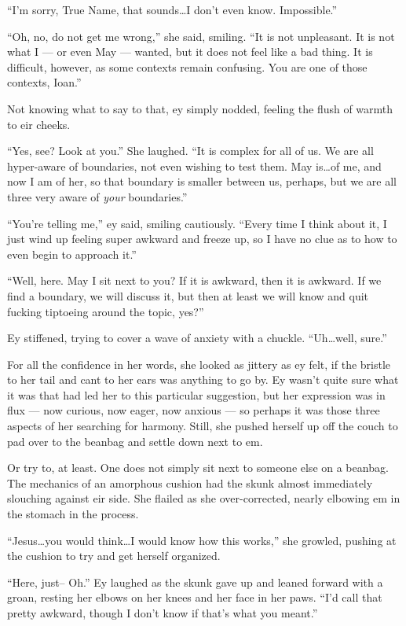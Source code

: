 ``I'm sorry, True Name, that sounds\ldots I don't even know. Impossible.''

``Oh, no, do not get me wrong,'' she said, smiling. ``It is not unpleasant. It is not what I — or even May — wanted, but it does not feel like a bad thing. It is difficult, however, as some contexts remain confusing. You are one of those contexts, Ioan.''

Not knowing what to say to that, ey simply nodded, feeling the flush of warmth to eir cheeks.

``Yes, see? Look at you.'' She laughed. ``It is complex for all of us. We are all hyper-aware of boundaries, not even wishing to test them. May is\ldots of me, and now I am of her, so that boundary is smaller between us, perhaps, but we are all three very aware of \emph{your} boundaries.''

``You're telling me,'' ey said, smiling cautiously. ``Every time I think about it, I just wind up feeling super awkward and freeze up, so I have no clue as to how to even begin to approach it.''

``Well, here. May I sit next to you? If it is awkward, then it is awkward. If we find a boundary, we will discuss it, but then at least we will know and quit fucking tiptoeing around the topic, yes?''

Ey stiffened, trying to cover a wave of anxiety with a chuckle. ``Uh\ldots well, sure.''

For all the confidence in her words, she looked as jittery as ey felt, if the bristle to her tail and cant to her ears was anything to go by. Ey wasn't quite sure what it was that had led her to this particular suggestion, but her expression was in flux — now curious, now eager, now anxious — so perhaps it was those three aspects of her searching for harmony. Still, she pushed herself up off the couch to pad over to the beanbag and settle down next to em.

Or try to, at least. One does not simply sit next to someone else on a beanbag. The mechanics of an amorphous cushion had the skunk almost immediately slouching against eir side. She flailed as she over-corrected, nearly elbowing em in the stomach in the process.

``Jesus\ldots you would think\ldots I would know how this works,'' she growled, pushing at the cushion to try and get herself organized.

``Here, just-- Oh.'' Ey laughed as the skunk gave up and leaned forward with a groan, resting her elbows on her knees and her face in her paws. ``I'd call that pretty awkward, though I don't know if that's what you meant.''

